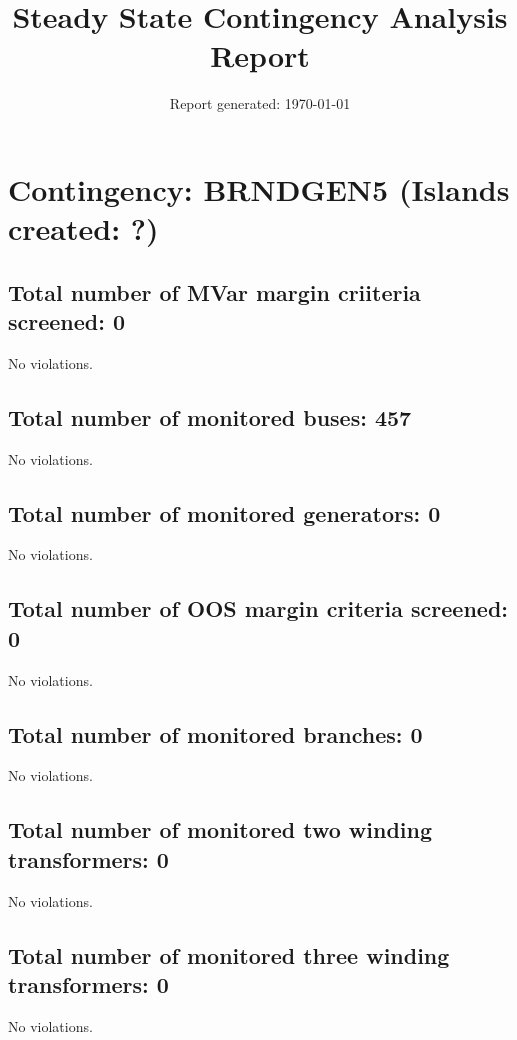 \documentclass{article}%
\title{Steady State Contingency Analysis Report\vspace{-3ex}}%
\date{Report generated: \today\vspace{-2ex}}%
\begin{document}
%
\normalsize%
\maketitle%
\section*{Contingency: BRNDGEN5 (Islands created: ?)}%
\label{sec:ContingencyBRNDGEN5(Islandscreated?)}%
\subsection*{Total number of MVar margin criiteria screened: 0}%
\label{subsec:TotalnumberofMVarmargincriiteriascreened0}%
No violations.

%
\subsection*{Total number of monitored buses: 457}%
\label{subsec:Totalnumberofmonitoredbuses457}%
No violations.

%
\subsection*{Total number of monitored generators: 0}%
\label{subsec:Totalnumberofmonitoredgenerators0}%
No violations.

%
\subsection*{Total number of OOS margin criteria screened: 0}%
\label{subsec:TotalnumberofOOSmargincriteriascreened0}%
No violations.

%
\subsection*{Total number of monitored branches: 0}%
\label{subsec:Totalnumberofmonitoredbranches0}%
No violations.

%
\subsection*{Total number of monitored two winding transformers: 0}%
\label{subsec:Totalnumberofmonitoredtwowindingtransformers0}%
No violations.

%
\subsection*{Total number of monitored three winding transformers: 0}%
\label{subsec:Totalnumberofmonitoredthreewindingtransformers0}%
No violations.

%
\end{document}
